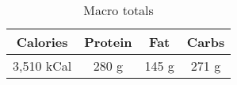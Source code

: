 \begin{multicols}{2}
\begin{enumerate}
\end{enumerate}
\begin{table}[H]
  \begin{center}
    \caption{Macro totals}
    \label{tab:table1}
    \begin{tabular}{c|c|c|c} %
      \textbf{Calories} & \textbf{Protein} & \textbf{Fat} & \textbf{Carbs}\\
      \hline
      3,510 kCal & 280 g & 145 g & 271 g\\
    \end{tabular}
  \end{center}
\end{table}
\end{multicols}




